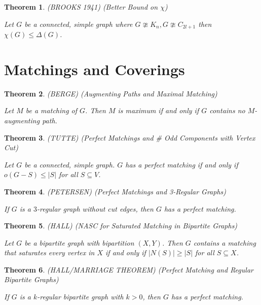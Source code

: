 \documentclass[12pt]{amsart}
\newtheorem{thm}{Theorem}
\theoremstyle{definition}
\begin{document}
\begin{thm} (BROOKS 1941) (Better Bound on $\chi$)

Let $G$ be a connected, simple graph where $G\ncong K_n, G\ncong C_{2l+1}$ then $\chi(G)\leq \Delta(G)$. 
\end{thm}


\section{Matchings and Coverings}

\begin{thm} (BERGE) (Augmenting Paths and Maximal Matching)

Let $M$ be a matching of $G$. Then $M$ is maximum if and only if $G$ contains no $M$-augmenting path.
\end{thm}


\begin{thm} (TUTTE) (Perfect Matchings and \# Odd Components with Vertex Cut)

Let $G$ be a connected, simple graph. $G$ has a perfect matching if and only if $o(G-S) \leq |S|$ for all $S \subseteq V$.
\end{thm}


\begin{thm} (PETERSEN) (Perfect Matchings and 3-Regular Graphs)

If $G$ is a $3$-regular graph without cut edges, then $G$ has a perfect matching.
\end{thm}


\begin{thm} (HALL) (NASC for Saturated Matching in Bipartite Graphs)

Let $G$ be a bipartite graph with bipartition $(X,Y)$. Then $G$ contains a matching that saturates
every vertex in $X$ if and only if $|N(S)| \geq |S|$ for all $S \subseteq X$.
\end{thm}


\begin{thm} (HALL/MARRIAGE THEOREM) (Perfect Matching and Regular Bipartite Graphs)

If $G$ is a $k$-regular bipartite graph with $k > 0$, then $G$ has a perfect matching.
\end{thm}
\end{document}
